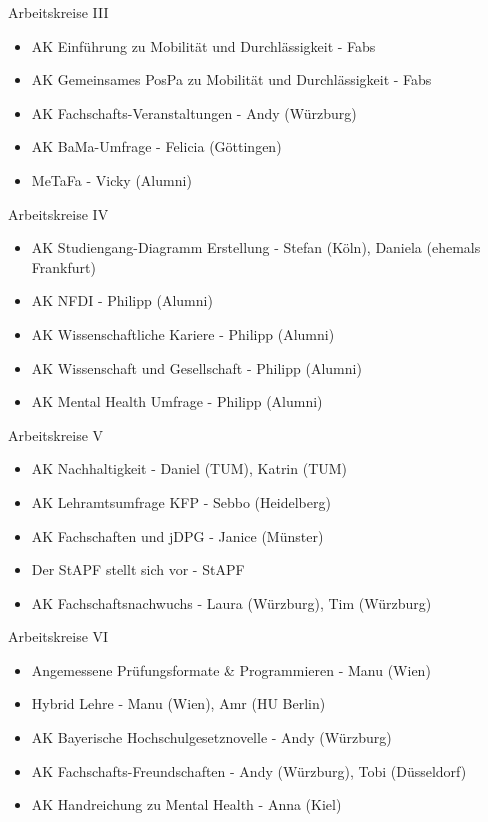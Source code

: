 \documentclass[compress, aspectratio=169]{beamer}
\begin{document}
\begin{frame}{Arbeitskreise III}
	\begin{itemize}
		\item AK Einführung zu Mobilität und Durchlässigkeit - Fabs
		\item AK Gemeinsames PosPa zu Mobilität und Durchlässigkeit -  Fabs
		\item AK Fachschafts-Veranstaltungen - Andy (Würzburg)
		\item AK BaMa-Umfrage - Felicia (Göttingen)
		\item MeTaFa - Vicky (Alumni)
	\end{itemize}
\end{frame}

\begin{frame}{Arbeitskreise IV}
	\begin{itemize}
		\item AK Studiengang-Diagramm Erstellung - Stefan (Köln), Daniela (ehemals Frankfurt)
		\item AK NFDI - Philipp (Alumni)
		\item AK Wissenschaftliche Kariere - Philipp (Alumni)
		\item AK Wissenschaft und Gesellschaft - Philipp (Alumni)
		\item AK Mental Health Umfrage - Philipp (Alumni)
	\end{itemize}
\end{frame}

\begin{frame}{Arbeitskreise V}
	\begin{itemize}
		\item AK Nachhaltigkeit - Daniel (TUM), Katrin (TUM)	
		\item AK Lehramtsumfrage KFP - Sebbo (Heidelberg)
		\item AK Fachschaften und jDPG - Janice (Münster)
		\item Der StAPF stellt sich vor - StAPF
		\item AK Fachschaftsnachwuchs - Laura (Würzburg), Tim (Würzburg) 
	\end{itemize}
\end{frame}

\begin{frame}{Arbeitskreise VI}
	\begin{itemize}
		\item Angemessene Prüfungsformate \& Programmieren - Manu (Wien) 
		\item Hybrid Lehre - Manu (Wien), Amr (HU Berlin)
		\item AK Bayerische Hochschulgesetznovelle - Andy (Würzburg) 
		\item AK Fachschafts-Freundschaften - Andy (Würzburg), Tobi (Düsseldorf)
		\item AK Handreichung zu Mental Health - Anna (Kiel) 
	\end{itemize}
\end{frame}
\end{document}
